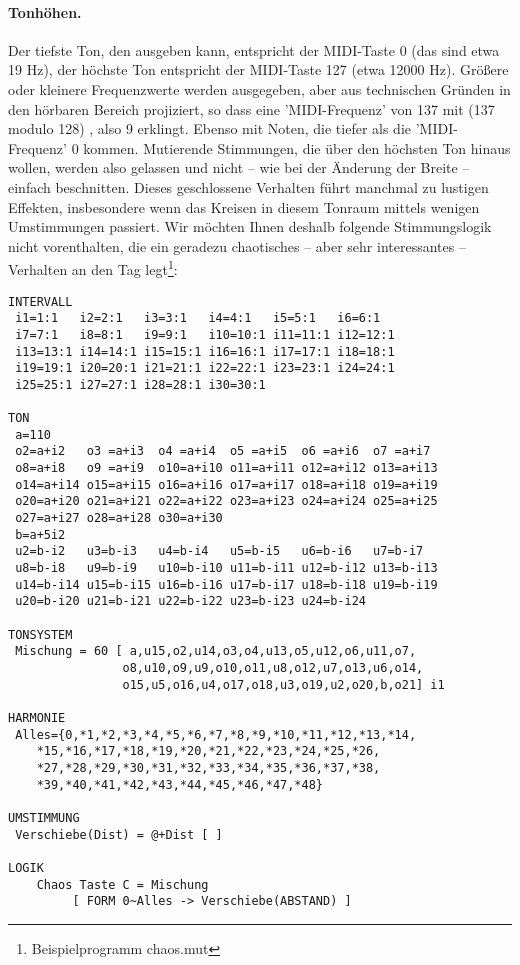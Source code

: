 \paragraph{Tonhöhen.} Der tiefste Ton, den \mutabor{} ausgeben
kann, entspricht der MIDI-Taste 0 (das sind
etwa 19 Hz), der höchste Ton entspricht der MIDI-Taste 127 (etwa 12000
Hz). Größere oder kleinere Frequenzwerte werden ausgegeben, aber aus
technischen Gründen in den hörbaren Bereich projiziert, so dass eine
'MIDI-Frequenz' von 137 mit (137 modulo 128) , also 9 erklingt. Ebenso
mit Noten, die tiefer als die 'MIDI-Frequenz' 0 kommen. Mutierende
Stimmungen, die über den höchsten Ton hinaus wollen, werden also
gelassen und nicht -- wie bei der Änderung der Breite -- einfach
beschnitten. Dieses geschlossene Verhalten führt manchmal zu lustigen
Effekten, insbesondere wenn das Kreisen in diesem Tonraum mittels
wenigen Umstimmungen passiert. Wir möchten Ihnen deshalb folgende
Stimmungslogik nicht vorenthalten, die ein geradezu chaotisches --
aber sehr interessantes -- Verhalten an den Tag
legt\footnote{Beispielprogramm chaos.mut}:
\label{CHAOS}
\begin{verbatim}
INTERVALL
 i1=1:1   i2=2:1   i3=3:1   i4=4:1   i5=5:1   i6=6:1
 i7=7:1   i8=8:1   i9=9:1   i10=10:1 i11=11:1 i12=12:1
 i13=13:1 i14=14:1 i15=15:1 i16=16:1 i17=17:1 i18=18:1
 i19=19:1 i20=20:1 i21=21:1 i22=22:1 i23=23:1 i24=24:1
 i25=25:1 i27=27:1 i28=28:1 i30=30:1

TON
 a=110
 o2=a+i2   o3 =a+i3  o4 =a+i4  o5 =a+i5  o6 =a+i6  o7 =a+i7
 o8=a+i8   o9 =a+i9  o10=a+i10 o11=a+i11 o12=a+i12 o13=a+i13
 o14=a+i14 o15=a+i15 o16=a+i16 o17=a+i17 o18=a+i18 o19=a+i19
 o20=a+i20 o21=a+i21 o22=a+i22 o23=a+i23 o24=a+i24 o25=a+i25
 o27=a+i27 o28=a+i28 o30=a+i30
 b=a+5i2
 u2=b-i2   u3=b-i3   u4=b-i4   u5=b-i5   u6=b-i6   u7=b-i7
 u8=b-i8   u9=b-i9   u10=b-i10 u11=b-i11 u12=b-i12 u13=b-i13
 u14=b-i14 u15=b-i15 u16=b-i16 u17=b-i17 u18=b-i18 u19=b-i19
 u20=b-i20 u21=b-i21 u22=b-i22 u23=b-i23 u24=b-i24

TONSYSTEM
 Mischung = 60 [ a,u15,o2,u14,o3,o4,u13,o5,u12,o6,u11,o7,
                o8,u10,o9,u9,o10,o11,u8,o12,u7,o13,u6,o14,
                o15,u5,o16,u4,o17,o18,u3,o19,u2,o20,b,o21] i1

HARMONIE
 Alles={0,*1,*2,*3,*4,*5,*6,*7,*8,*9,*10,*11,*12,*13,*14,
    *15,*16,*17,*18,*19,*20,*21,*22,*23,*24,*25,*26,
    *27,*28,*29,*30,*31,*32,*33,*34,*35,*36,*37,*38,
    *39,*40,*41,*42,*43,*44,*45,*46,*47,*48}

UMSTIMMUNG
 Verschiebe(Dist) = @+Dist [ ] 

LOGIK
    Chaos Taste C = Mischung 
         [ FORM 0~Alles -> Verschiebe(ABSTAND) ]
\end{verbatim}

